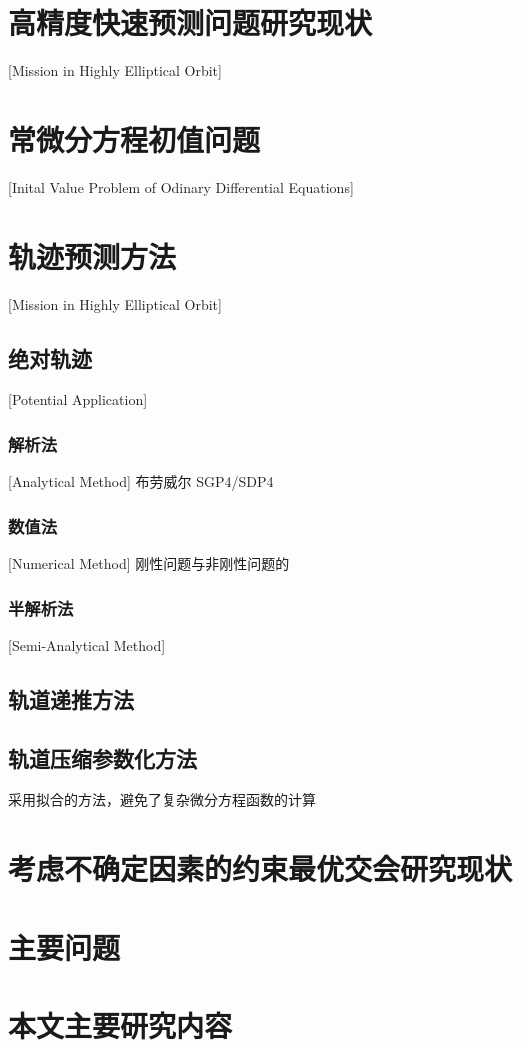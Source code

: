 \section{高精度快速预测问题研究现状}[Mission in Highly Elliptical Orbit]
\section{常微分方程初值问题}[Inital Value Problem of Odinary Differential Equations]

\section{轨迹预测方法}[Mission in Highly Elliptical Orbit]

\subsection{绝对轨迹}[Potential Application]

\subsubsection{解析法}[Analytical Method]
布劳威尔
SGP4/SDP4

\subsubsection{数值法}[Numerical Method]
刚性问题与非刚性问题的

\subsubsection{半解析法}[Semi-Analytical Method]


\subsection{轨道递推方法}
\subsection{轨道压缩参数化方法}
采用拟合的方法，避免了复杂微分方程函数的计算
\section{考虑不确定因素的约束最优交会研究现状}

\section{主要问题}

\section{本文主要研究内容}

